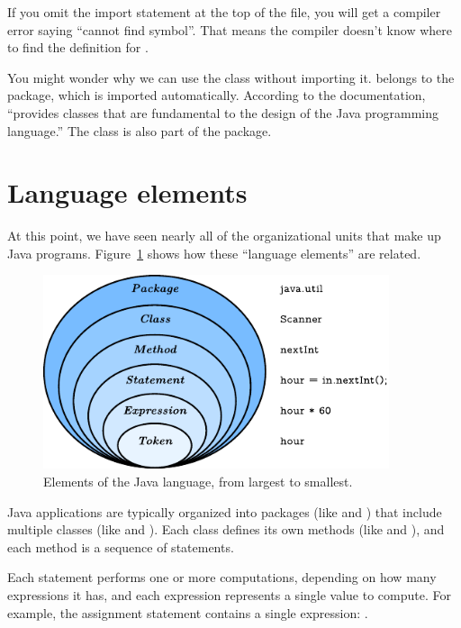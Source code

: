 If you omit the import statement at the top of the file, you will get a compiler error saying ``cannot find symbol''.
That means the compiler doesn't know where to find the definition for .

You might wonder why we can use the  class without importing it.
 belongs to the  package, which is imported automatically.
According to the documentation,  ``provides classes that are fundamental to the design of the Java programming language.''
The  class is also part of the  package.


\section{Language elements}
\label{sec:library}

At this point, we have seen nearly all of the organizational units that make up Java programs.
Figure~\ref{fig.package} shows how these ``language elements'' are related.

\begin{figure}[!ht]
\begin{center}
\includegraphics[width=4in]{figs/package.pdf}
\caption{Elements of the Java language, from largest to smallest.}
\label{fig.package}
\end{center}
\end{figure}


Java applications are typically organized into packages (like  and ) that include multiple classes (like  and ).
Each class defines its own methods (like  and ), and each method is a sequence of statements.

Each statement performs one or more computations, depending on how many expressions it has, and each expression represents a single value to compute.
For example, the assignment statement  contains a single expression: .

